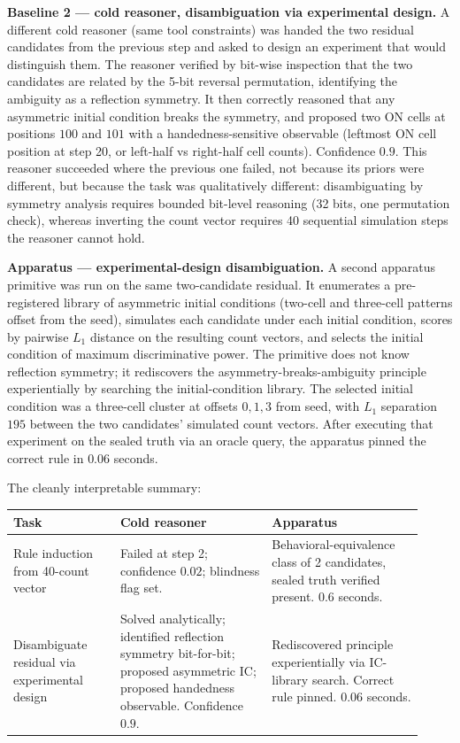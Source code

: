 \documentclass[11pt]{article}
\begin{document}
\textbf{Baseline 2 --- cold reasoner, disambiguation via experimental design.} A different cold reasoner (same tool constraints) was handed the two residual candidates from the previous step and asked to design an experiment that would distinguish them. The reasoner verified by bit-wise inspection that the two candidates are related by the 5-bit reversal permutation, identifying the ambiguity as a reflection symmetry. It then correctly reasoned that any asymmetric initial condition breaks the symmetry, and proposed two ON cells at positions $100$ and $101$ with a handedness-sensitive observable (leftmost ON cell position at step 20, or left-half vs right-half cell counts). Confidence $0.9$. This reasoner succeeded where the previous one failed, not because its priors were different, but because the task was qualitatively different: disambiguating by symmetry analysis requires bounded bit-level reasoning (32 bits, one permutation check), whereas inverting the count vector requires 40 sequential simulation steps the reasoner cannot hold.

\textbf{Apparatus --- experimental-design disambiguation.} A second apparatus primitive was run on the same two-candidate residual. It enumerates a pre-registered library of asymmetric initial conditions (two-cell and three-cell patterns offset from the seed), simulates each candidate under each initial condition, scores by pairwise $L_1$ distance on the resulting count vectors, and selects the initial condition of maximum discriminative power. The primitive does not know reflection symmetry; it rediscovers the asymmetry-breaks-ambiguity principle experientially by searching the initial-condition library. The selected initial condition was a three-cell cluster at offsets $0, 1, 3$ from seed, with $L_1$ separation $195$ between the two candidates' simulated count vectors. After executing that experiment on the sealed truth via an oracle query, the apparatus pinned the correct rule in $0.06$ seconds.

The cleanly interpretable summary:

\begin{center}
\begin{tabular}{p{0.24\linewidth} p{0.34\linewidth} p{0.34\linewidth}}
\toprule
\textbf{Task} & \textbf{Cold reasoner} & \textbf{Apparatus} \\
\midrule
Rule induction from 40-count vector & Failed at step 2; confidence $0.02$; blindness flag set. & Behavioral-equivalence class of 2 candidates, sealed truth verified present. $0.6$ seconds. \\
\midrule
Disambiguate residual via experimental design & Solved analytically; identified reflection symmetry bit-for-bit; proposed asymmetric IC; proposed handedness observable. Confidence $0.9$. & Rediscovered principle experientially via IC-library search. Correct rule pinned. $0.06$ seconds. \\
\bottomrule
\end{tabular}
\end{center}
\end{document}
